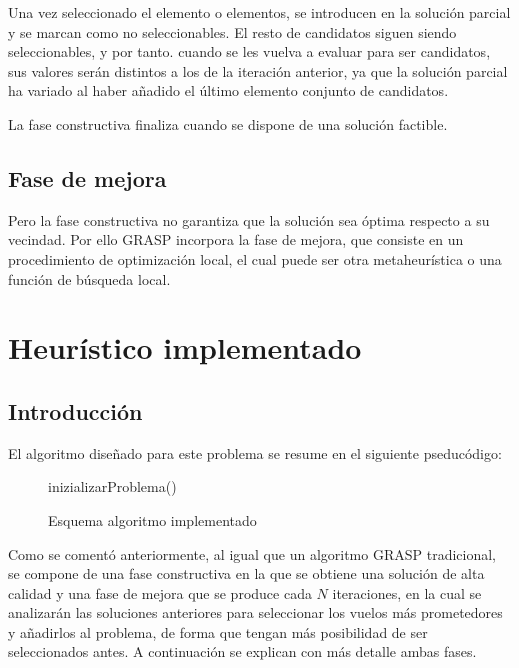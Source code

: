Una vez seleccionado el elemento o elementos, se introducen en la solución parcial y se marcan como no seleccionables. El resto de candidatos siguen siendo seleccionables, y por tanto. cuando se les vuelva a evaluar para ser candidatos, sus valores serán distintos a los de la iteración anterior, ya que la solución parcial ha variado al haber añadido el último elemento conjunto de candidatos.

La fase constructiva finaliza cuando se dispone de una solución factible.
\subsection{Fase de mejora}
Pero la fase constructiva no garantiza que la solución sea óptima respecto a su vecindad. Por ello GRASP incorpora la fase de mejora, que consiste en un procedimiento de optimización local, el cual puede ser otra metaheurística o una función de búsqueda local.
\section{Heurístico implementado}
\subsection{Introducción}
El algoritmo diseñado para este problema se resume en el siguiente pseducódigo:\\

\begin{figure}[ht]
	\centering
	\begin{minipage}{.7\linewidth}
		\begin{algorithm}[H]
			\SetAlgoLined
			inizializarProblema()\;
		\caption{Esquema algoritmo implementado}
	\end{algorithm}
\end{minipage}
\end{figure}


Como se comentó anteriormente, al igual que un algoritmo GRASP tradicional, se compone de una fase constructiva en la que se obtiene una solución de alta calidad y una fase de mejora que se produce cada $N$ iteraciones, en la cual se analizarán las soluciones anteriores para seleccionar los vuelos más prometedores y añadirlos al problema, de forma que tengan más posibilidad de ser seleccionados antes. A continuación se explican con más detalle ambas fases.

